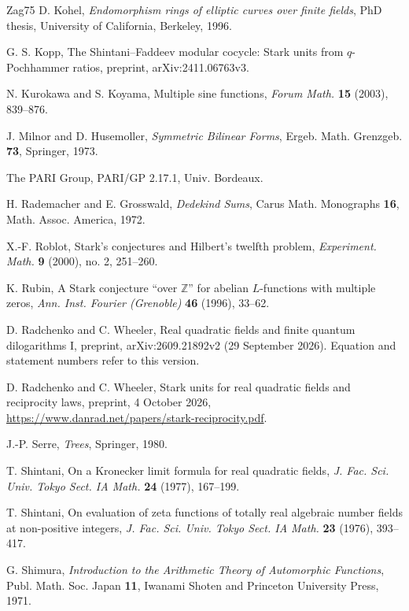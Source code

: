 \documentclass[11pt]{amsart}
\numberwithin{equation}{section}
\theoremstyle{plain}
\theoremstyle{definition}
\theoremstyle{remark}
\begin{document}
\begin{thebibliography}{Zag75}
 D. Kohel, \emph{Endomorphism rings of elliptic curves over finite fields}, PhD thesis, University of California, Berkeley, 1996.

 G. S. Kopp, The Shintani--Faddeev modular cocycle: Stark units from $q$-Pochhammer ratios, preprint, arXiv:2411.06763v3.

 N. Kurokawa and S. Koyama, Multiple sine functions, \emph{Forum Math.} \textbf{15} (2003), 839--876.

 J. Milnor and D. Husemoller, \emph{Symmetric Bilinear Forms}, Ergeb. Math. Grenzgeb. \textbf{73}, Springer, 1973.

 The PARI Group, PARI/GP 2.17.1, Univ. Bordeaux.

 H. Rademacher and E. Grosswald, \emph{Dedekind Sums}, Carus Math. Monographs \textbf{16}, Math. Assoc. America, 1972.

 X.-F. Roblot, Stark's conjectures and Hilbert's twelfth problem, \emph{Experiment. Math.} \textbf{9} (2000), no. 2, 251--260.

 K. Rubin, A Stark conjecture ``over $\mathbb Z$'' for abelian $L$-functions with multiple zeros, \emph{Ann. Inst. Fourier (Grenoble)} \textbf{46} (1996), 33--62.

 D. Radchenko and C. Wheeler, Real quadratic fields and finite quantum dilogarithms I, preprint, arXiv:2609.21892v2 (29 September 2026). Equation and statement numbers refer to this version.

 D. Radchenko and C. Wheeler, Stark units for real quadratic fields and reciprocity laws, preprint, 4 October 2026, \url{https://www.danrad.net/papers/stark-reciprocity.pdf}.

 J.-P. Serre, \emph{Trees}, Springer, 1980.

 T. Shintani, On a Kronecker limit formula for real quadratic fields, \emph{J. Fac. Sci. Univ. Tokyo Sect. IA Math.} \textbf{24} (1977), 167--199.

 T. Shintani, On evaluation of zeta functions of totally real algebraic number fields at non-positive integers, \emph{J. Fac. Sci. Univ. Tokyo Sect. IA Math.} \textbf{23} (1976), 393--417.

 G. Shimura, \emph{Introduction to the Arithmetic Theory of Automorphic Functions}, Publ. Math. Soc. Japan \textbf{11}, Iwanami Shoten and Princeton University Press, 1971.


\end{thebibliography}
\end{document}
